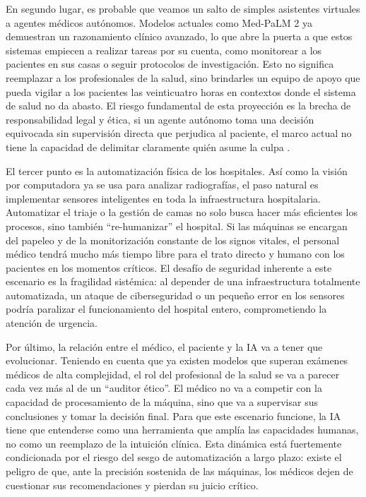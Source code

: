 \documentclass[10pt,a4paper]{article}
\begin{document}
En segundo lugar, es probable que veamos un salto de simples asistentes virtuales a agentes médicos autónomos. Modelos actuales como Med-PaLM 2 ya demuestran un razonamiento clínico avanzado, lo que abre la puerta a que estos sistemas empiecen a realizar tareas por su cuenta, como monitorear a los pacientes en sus casas o seguir protocolos de investigación. Esto no significa reemplazar a los profesionales de la salud, sino brindarles un equipo de apoyo que pueda vigilar a los pacientes las veinticuatro horas en contextos donde el sistema de salud no da abasto. El riesgo fundamental de esta proyección es la brecha de responsabilidad legal y ética, si un agente autónomo toma una decisión equivocada sin supervisión directa que perjudica al paciente, el marco actual no tiene la capacidad de delimitar claramente quién asume la culpa \cite{gopi}.

El tercer punto es la automatización física de los hospitales. Así como la visión por computadora ya se usa para analizar radiografías, el paso natural es implementar sensores inteligentes en toda la infraestructura hospitalaria. Automatizar el triaje o la gestión de camas no solo busca hacer más eficientes los procesos, sino también ``re-humanizar'' el hospital. Si las máquinas se encargan del papeleo y de la monitorización constante de los signos vitales, el personal médico tendrá mucho más tiempo libre para el trato directo y humano con los pacientes en los momentos críticos. El desafío de seguridad inherente a este escenario es la fragilidad sistémica: al depender de una infraestructura totalmente automatizada, un ataque de ciberseguridad o un pequeño error en los sensores podría paralizar el funcionamiento del hospital entero, comprometiendo la atención de urgencia.

Por último, la relación entre el médico, el paciente y la IA va a tener que evolucionar. Teniendo en cuenta que ya existen modelos que superan exámenes médicos de alta complejidad, el rol del profesional de la salud se va a parecer cada vez más al de un ``auditor ético''. El médico no va a competir con la capacidad de procesamiento de la máquina, sino que va a supervisar sus conclusiones y tomar la decisión final. Para que este escenario funcione, la IA tiene que entenderse como una herramienta que amplía las capacidades humanas, no como un reemplazo de la intuición clínica. Esta dinámica está fuertemente condicionada por el riesgo del sesgo de automatización a largo plazo: existe el peligro de que, ante la precisión sostenida de las máquinas, los médicos dejen de cuestionar sus recomendaciones y pierdan su juicio crítico. 
\end{document}
